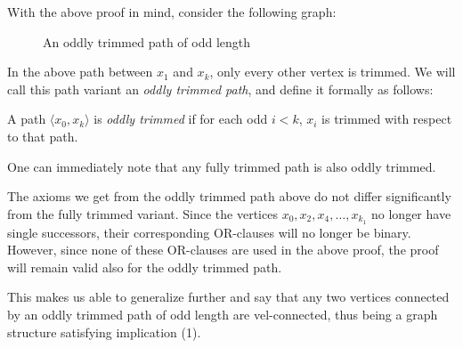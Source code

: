With the above proof in mind, consider the following graph:\par
\begin{figure}[!h]
  \centering
  \caption{An oddly trimmed path of odd length}
  \label{fig:oddly_trimmed_path}
\end{figure}
\FloatBarrier
In the above path between $x_1$ and $x_k$, only every other vertex is trimmed.
We will call this path variant an \textit{oddly trimmed path}, and define it formally as follows:
\begin{definition}
  A path $\langle x_0,x_k\rangle$ is \textit{oddly trimmed} if for each odd $i < k$, $x_i$ is trimmed with respect to that path.
\end{definition}
One can immediately note that any fully trimmed path is also oddly trimmed.

The axioms we get from the oddly trimmed path above do not differ significantly from the fully trimmed variant.
Since the vertices $x_0, x_2, x_4, \dots ,x_{k_1}$ no longer have single successors, their corresponding OR-clauses will no longer be binary.
However, since none of these OR-clauses are used in the above proof, the proof will remain valid also for the oddly trimmed path.

This makes us able to generalize further and say that any two vertices connected by an oddly trimmed path of odd length are vel-connected, thus being a graph structure satisfying implication (1).
